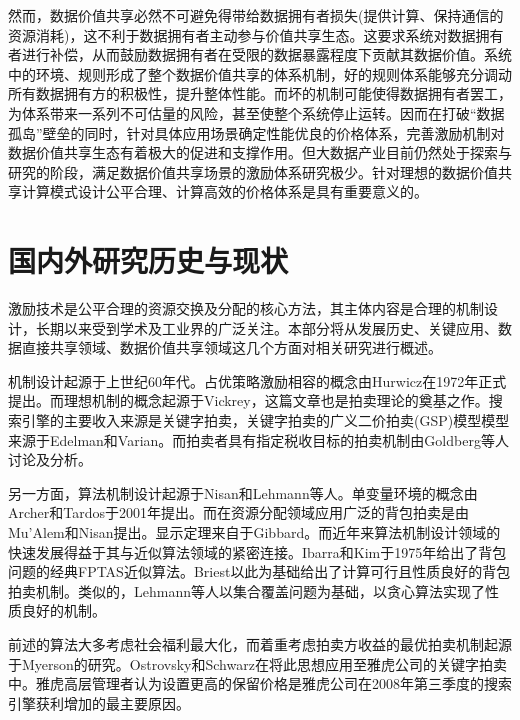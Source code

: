 \documentclass[promaster]{thesis-uestc}
\begin{document}
然而，数据价值共享必然不可避免得带给数据拥有者损失(提供计算、保持通信的资源消耗)，这不利于数据拥有者主动参与价值共享生态。这要求系统对数据拥有者进行补偿，从而鼓励数据拥有者在受限的数据暴露程度下贡献其数据价值。系统中的环境、规则形成了整个数据价值共享的体系机制，好的规则体系能够充分调动所有数据拥有方的积极性，提升整体性能。而坏的机制可能使得数据拥有者罢工，为体系带来一系列不可估量的风险，甚至使整个系统停止运转。因而在打破“数据孤岛”壁垒的同时，针对具体应用场景确定性能优良的价格体系，完善激励机制对数据价值共享生态有着极大的促进和支撑作用。但大数据产业目前仍然处于探索与研究的阶段，满足数据价值共享场景的激励体系研究极少。针对理想的数据价值共享计算模式设计公平合理、计算高效的价格体系是具有重要意义的。


\section{国内外研究历史与现状}

激励技术是公平合理的资源交换及分配的核心方法，其主体内容是合理的机制设计，长期以来受到学术及工业界的广泛关注。本部分将从发展历史、关键应用、数据直接共享领域、数据价值共享领域这几个方面对相关研究进行概述。

机制设计起源于上世纪60年代。占优策略激励相容的概念由Hurwicz在1972年正式提出。而理想机制的概念起源于Vickrey，这篇文章也是拍卖理论的奠基之作。搜索引擎的主要收入来源是关键字拍卖，关键字拍卖的广义二价拍卖(GSP)模型模型来源于Edelman和Varian。而拍卖者具有指定税收目标的拍卖机制由Goldberg等人讨论及分析。

另一方面，算法机制设计起源于Nisan和Lehmann等人。单变量环境的概念由Archer和Tardos于2001年提出。而在资源分配领域应用广泛的背包拍卖是由Mu'Alem和Nisan提出。显示定理来自于Gibbard。而近年来算法机制设计领域的快速发展得益于其与近似算法领域的紧密连接。Ibarra和Kim于1975年给出了背包问题的经典FPTAS近似算法。Briest以此为基础给出了计算可行且性质良好的背包拍卖机制。类似的，Lehmann等人以集合覆盖问题为基础，以贪心算法实现了性质良好的机制。

前述的算法大多考虑社会福利最大化，而着重考虑拍卖方收益的最优拍卖机制起源于Myerson的研究。Ostrovsky和Schwarz在将此思想应用至雅虎公司的关键字拍卖中。雅虎高层管理者认为设置更高的保留价格是雅虎公司在2008年第三季度的搜索引擎获利增加的最主要原因。
\end{document}
